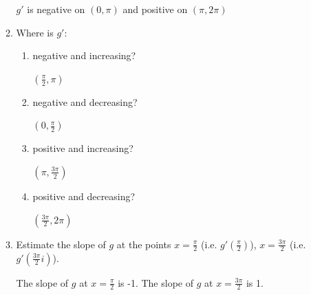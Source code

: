 \documentclass[nooutcomes]{ximera}
\begin{document}
\begin{problem}
\begin{enumerate}
\begin{enumerate}
		\begin{freeResponse}
			$g'$ is negative on $(0,\pi)$ and positive on $(\pi,2\pi)$
		\end{freeResponse}
			\item Where is $g'$:
			\begin{enumerate}
			\item negative and increasing?
				\begin{freeResponse}
					$(\frac{\pi}{2},\pi)$
				\end{freeResponse}
			\item negative and decreasing?
				\begin{freeResponse}
					$(0,\frac{\pi}{2})$
				\end{freeResponse}
			\item positive and increasing?
				\begin{freeResponse}
					$(\pi,\frac{3\pi}{2})$
				\end{freeResponse}
			\item positive and decreasing?
				\begin{freeResponse}
					$(\frac{3\pi}{2},2\pi)$
				\end{freeResponse}
			\end{enumerate}
			\item Estimate the slope of $g$ at the points $x=\frac{\pi}{2}$ (i.e. $g'(\frac{\pi}{2})$), $x=\frac{3\pi}{2}$ (i.e. $g'(\frac{3\pi}{2}i)$).
				\begin{freeResponse}
					The slope of $g$ at  $x=\frac{\pi}{2}$  is -1.  The slope of $g$ at $x=\frac{3\pi}{2}$ is 1.
				\end{freeResponse}
		\end{enumerate}			


\end{enumerate}
\end{problem}
\end{document}
